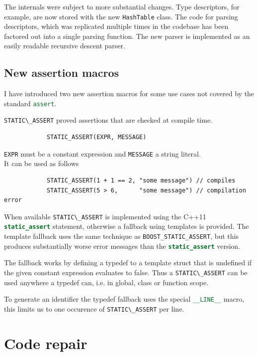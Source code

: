 \documentclass[12pt,a4paper,oneside]{article}
\newcommand{\cpp}[1]{\lstinline[language=C++]{#1}}
\begin{document}
	The internals were subject to more substantial changes.
	Type descriptors, for example, are now stored with the new \cpp{HashTable} class.
	The code for parsing descriptors, which was replicated multiple times in the codebase has
	been factored out into a single parsing function.
	The new parser is implemented as an easily readable recursive descent parser.

\subsection{New assertion macros}
	I have introduced two new assertion macros for some use cases not covered by the standard \cpp{assert}.

	\cpp{STATIC\_ASSERT} proved assertions that are checked at compile time.
		\begin{lstlisting}
			STATIC_ASSERT(EXPR, MESSAGE)
		\end{lstlisting}
	\cpp{EXPR} must be a constant expression and \cpp{MESSAGE} a string literal. \\
	It can be used as follows
		\begin{lstlisting}
			STATIC_ASSERT(1 + 1 == 2, "some message") // compiles
			STATIC_ASSERT(5 > 6,      "some message") // compilation error
		\end{lstlisting}

	When available \cpp{STATIC\_ASSERT} is implemented using the C++11 \cpp{static_assert} statement, 
	otherwise a fallback using templates is provided.
	The template fallback uses the same technique as \cpp{BOOST_STATIC_ASSERT}\cite{static_assert}, but this produces
	substantially worse error messages than the \cpp{static_assert} version.

	The fallback works by defining a typedef to a template struct that is undefined if the given constant
	expression evaluates to false.
	Thus a \cpp{STATIC\_ASSERT} can be used anywhere a typedef can, i.e. in global, class or function scope.

	To generate an identifier the typedef fallback uses the special \cpp{__LINE__} macro,
	this limits us to one occurence of \cpp{STATIC\_ASSERT} per line.


\section{Code repair}
\label{repair}
\end{document}
